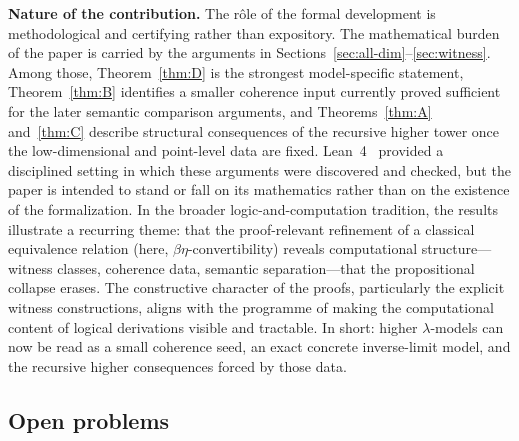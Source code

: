 \documentclass[webpdf,traditional,large,numbered]{oup-authoring-template}
\theoremstyle{thmstyleone}%
\theoremstyle{thmstyletwo}%
\theoremstyle{thmstylethree}%
\begin{document}
\medskip
\noindent\textbf{Nature of the contribution.}\quad
The rôle of the formal development is methodological and certifying rather than
expository.  The mathematical burden of the paper is carried by the arguments in
Sections~\ref{sec:all-dim}--\ref{sec:witness}.  Among those, Theorem~\ref{thm:D}
is the strongest model-specific statement, Theorem~\ref{thm:B} identifies a
smaller coherence input currently proved sufficient for the later semantic
comparison arguments, and
Theorems~\ref{thm:A} and~\ref{thm:C} describe structural consequences of the
recursive higher tower once the low-dimensional and point-level data are fixed.
Lean~4~\cite{Lean4} provided a disciplined setting in which these arguments were
discovered and checked, but the paper is intended to stand or fall on its
mathematics rather than on the existence of the formalization.
In the broader logic-and-computation tradition, the results illustrate a
recurring theme: that the proof-relevant refinement of a classical equivalence
relation (here, $\beta\eta$-convertibility) reveals computational
structure---witness classes, coherence data, semantic separation---that the
propositional collapse erases.  The constructive character of the proofs,
particularly the explicit witness constructions, aligns with the programme of
making the computational content of logical derivations visible and tractable.
In short: higher $\lambda$-models can now be read as a small coherence seed, an
exact concrete inverse-limit model, and the recursive higher consequences
forced by those data.

\subsection{Open problems}
\end{document}
